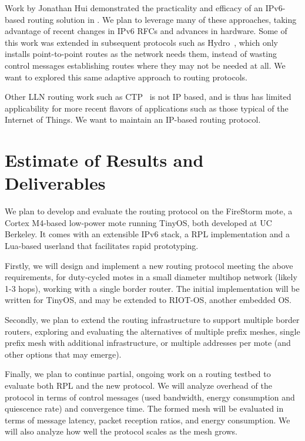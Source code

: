 \documentclass[10pt]{article}
\begin{document}
Work by Jonathan Hui demonstrated the practicality and efficacy of an IPv6-based routing solution in \cite{hui2008ip, hui2008extended}. We plan to leverage many of these approaches, taking advantage of recent changes in IPv6 RFCs and advances in hardware.
Some of this work was extended in subsequent protocols such as Hydro~\cite{dawson2010hydro}, which only installs point-to-point routes as the network needs them, instead of wasting control messages establishing routes where they may not be needed at all. We want to
explored this same adaptive approach to routing protocols.

Other LLN routing work such as CTP~\cite{fonseca2006collection} is not IP
based, and is thus has limited applicability for more recent flavors of
applications such as those typical of the Internet of Things. We want to
maintain an IP-based routing protocol.


\section{Estimate of Results and Deliverables}

We plan to develop and evaluate the routing protocol on the FireStorm mote, a Cortex M4-based low-power mote running TinyOS, both developed at UC Berkeley. It comes with an extensible IPv6 stack, a RPL implementation and a Lua-based userland that facilitates rapid prototyping. 

Firstly, we will design and implement a new routing protocol meeting the above requirements, for duty-cycled motes in a small diameter multihop network (likely 1-3 hops), working with a single border router. The initial implementation will be written for TinyOS, and may be extended to RIOT-OS, another embedded OS.

Secondly, we plan to extend the routing infrastructure to support multiple border routers, exploring and evaluating the alternatives of multiple prefix meshes, single prefix mesh with additional infrastructure, or multiple addresses per mote (and other options that may emerge).

Finally, we plan to continue partial, ongoing work on a routing testbed to evaluate both RPL and the new protocol. We will analyze overhead of the protocol in terms of control messages (used bandwidth, energy consumption and quiescence rate) and convergence time. The formed mesh will be evaluated in terms of message latency, packet reception ratios, and energy consumption. We will also analyze how well the protocol scales as the mesh grows.


 
\end{document}
